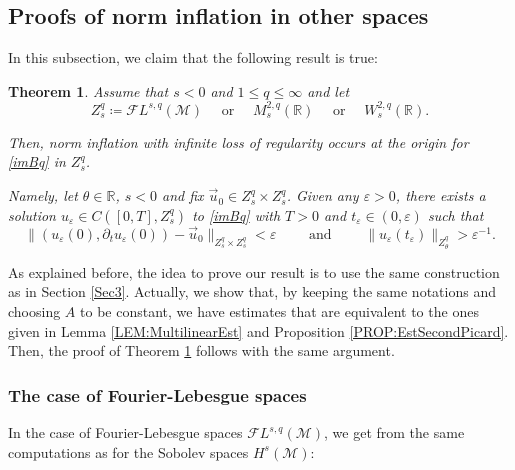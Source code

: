 \documentclass[letterpaper, 11pt,  reqno]{amsart}
\newtheorem{theorem}{Theorem} [section]
\newcommand{\1}{\hspace{0.5mm}\text{I}\hspace{0.5mm}}
\newcommand{\noi}{\noindent}
\newcommand{\R}{\mathbb{R}}
\newcommand{\M}{\mathcal{M}}
\newcommand{\FL}{\mathcal{F}L} %
\newcommand{\eps}{\varepsilon}
\newcommand{\dt}{\partial_t}
\numberwithin{equation}{section}
\numberwithin{theorem}{section}
\begin{document}
\subsection{Proofs of norm inflation in other spaces}



In this subsection, we claim that the following result is true:

\begin{theorem}
\label{THM:NIwithILORforFLMW}
Assume that $s < 0$ and $1 \leq q \leq \infty$ and let
\begin{equation}
\label{EQ:DefZsq}
Z_s^q \coloneqq \FL^{s,q}(\M) \quad \text{ or } \quad M_s^{2,q}(\R) \quad \text{ or } \quad W_s^{2,q}(\R).
\end{equation}

\noi Then, norm inflation with infinite loss of regularity occurs at the origin for \eqref{imBq} in $Z_s^q$.

\noi Namely, let $\theta \in \R$, $s < 0$ and fix $\vec{u}_0 \in Z_s^q \times Z_s^q$. Given any $\eps > 0$, there exists a solution $u_\eps \in C([0,T], Z_s^q)$ to \eqref{imBq} with $T > 0$ and $t_\eps \in (0, \eps)$ such that
$$
\| (u_\eps (0), \dt u_\eps (0) ) - \vec{u}_0 \|_{Z_s^q \times Z_s^q} < \eps \qquad \text{ and } \qquad \| u_\eps (t_\eps ) \|_{Z_\theta^q} > \eps^{-1}.
$$

\end{theorem} 

As explained before, the idea to prove our result is to use the same construction as in Section \ref{Sec3}. Actually, we show that, by keeping the same notations and choosing $A$ to be constant, we have estimates that are equivalent to the ones given in Lemma \ref{LEM:MultilinearEst} and Proposition \ref{PROP:EstSecondPicard}. Then, the proof of Theorem \ref{THM:NIwithILORforFLMW} follows with the same argument.



\subsubsection{The case of Fourier-Lebesgue spaces}

In the case of Fourier-Lebesgue spaces $\FL^{s,q} (\M)$, we get from the same computations as for the Sobolev spaces $H^s (\M)$:
\end{document}
